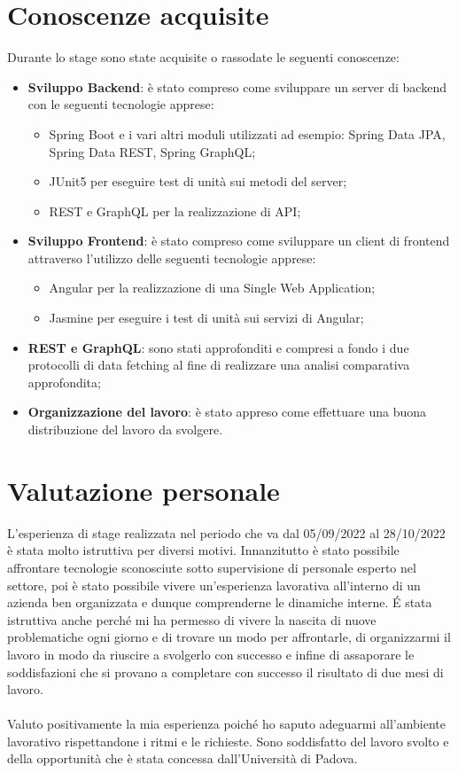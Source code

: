 \section{Conoscenze acquisite}
Durante lo stage sono state acquisite o rassodate le seguenti conoscenze:
\begin{itemize}
  \item \textbf{Sviluppo Backend}: è stato compreso come sviluppare un server di backend con le seguenti tecnologie apprese:
  \begin{itemize}
    \item Spring Boot e i vari altri moduli utilizzati ad esempio: Spring Data JPA, Spring Data REST, Spring GraphQL;
    \item JUnit5 per eseguire test di unità sui metodi del server;
    \item REST e GraphQL per la realizzazione di API;
  \end{itemize}
  \item \textbf{Sviluppo Frontend}: è stato compreso come sviluppare un client di frontend attraverso l'utilizzo delle seguenti tecnologie apprese:
  \begin{itemize}
    \item Angular per la realizzazione di una Single Web Application;
    \item Jasmine per eseguire i test di unità sui servizi di Angular;
  \end{itemize}
  \item \textbf{REST e GraphQL}: sono stati approfonditi e compresi a fondo i due protocolli di data fetching al fine di realizzare una analisi comparativa approfondita;
  \item \textbf{Organizzazione del lavoro}: è stato appreso come effettuare una buona distribuzione del lavoro da svolgere.
\end{itemize}
\section{Valutazione personale}
L'esperienza di stage realizzata nel periodo che va dal 05/09/2022 al 28/10/2022 è stata molto istruttiva per diversi motivi. Innanzitutto è stato possibile affrontare tecnologie sconosciute sotto supervisione di personale esperto nel settore, poi è stato possibile vivere un'esperienza lavorativa all'interno di un azienda ben organizzata e dunque comprenderne le dinamiche interne. É stata istruttiva anche perché mi ha permesso di vivere la nascita di nuove problematiche ogni giorno e di trovare un modo per affrontarle, di organizzarmi il lavoro in modo da riuscire a svolgerlo con successo e infine di assaporare le soddisfazioni che si provano a completare con successo il risultato di due mesi di lavoro.\\ \\
Valuto positivamente la mia esperienza poiché ho saputo adeguarmi all'ambiente lavorativo rispettandone i ritmi e le richieste. Sono soddisfatto del lavoro svolto e della opportunità che è stata concessa dall'Università di Padova.
